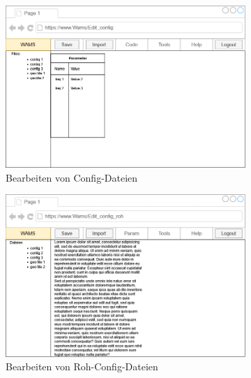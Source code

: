 \begin{figure}[ht]
    \centering
    \begin{subfigure}{.75\textwidth}
        \centering
        \includegraphics[width = \textwidth]{Grafiken/Gui Mockups/workflowGui-ConfigEdit.drawio.png}
    \caption{Bearbeiten von Config-Dateien}
    \label{fig: sfigKonfig}
    \end{subfigure}
   \begin{subfigure}{.75\textwidth}
    \centering
    \includegraphics[width = \textwidth]{Grafiken/Gui Mockups/workflowGui-ConfigEditRohdata.drawio.png}
    \caption{Bearbeiten von Roh-Config-Dateien}
    \label{fig:sfigRawConfig}
   \end{subfigure}
   \begin{subfigure}{.75\textwidth}
        \centering

\end{subfigure}
\end{figure}
